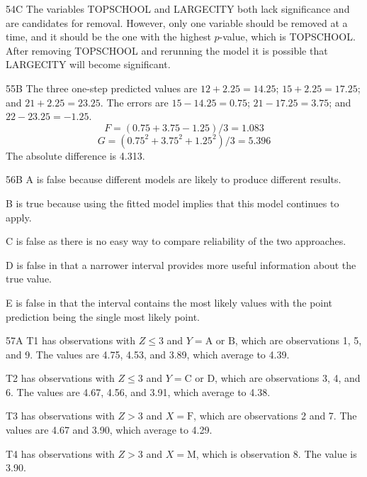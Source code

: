 \begin{solution}{54}{C}
The variables TOPSCHOOL and LARGECITY both lack significance and are candidates for removal. However, only one variable should be removed at a time, and it should be the one with the highest $p$-value, which is TOPSCHOOL. After removing TOPSCHOOL and rerunning the model it is possible that LARGECITY will become significant.
\end{solution}

\begin{solution}{55}{B}
The three one-step predicted values are $12 + 2.25 = 14.25$; $15 + 2.25 = 17.25$; and $21 + 2.25 = 23.25$. The errors are $15 - 14.25 = 0.75$; $21 - 17.25 = 3.75$; and $22 - 23.25 = -1.25$.
\[ F = (0.75 + 3.75 - 1.25)/3 = 1.083 \]
\[ G = (0.75^2 + 3.75^2 + 1.25^2)/3 = 5.396 \]
The absolute difference is 4.313.
\end{solution}

\begin{solution}{56}{B}
A is false because different models are likely to produce different results.

B is true because using the fitted model implies that this model continues to apply.

C is false as there is no easy way to compare reliability of the two approaches.

D is false in that a narrower interval provides more useful information about the true value.

E is false in that the interval contains the most likely values with the point prediction being the single most likely point.
\end{solution}

\begin{solution}{57}{A}
T1 has observations with $Z \leqslant 3$ and $Y = \mathrm{A}$ or $\mathrm{B}$, which are observations 1, 5, and 9. The values are 4.75, 4.53, and 3.89, which average to 4.39.

T2 has observations with $Z \leqslant 3$ and $Y = \mathrm{C}$ or $\mathrm{D}$, which are observations 3, 4, and 6. The values are 4.67, 4.56, and 3.91, which average to 4.38.

T3 has observations with $Z > 3$ and $X = \mathrm{F}$, which are observations 2 and 7. The values are 4.67 and 3.90, which average to 4.29.

T4 has observations with $Z > 3$ and $X = \mathrm{M}$, which is observation 8. The value is 3.90.
\end{solution}

